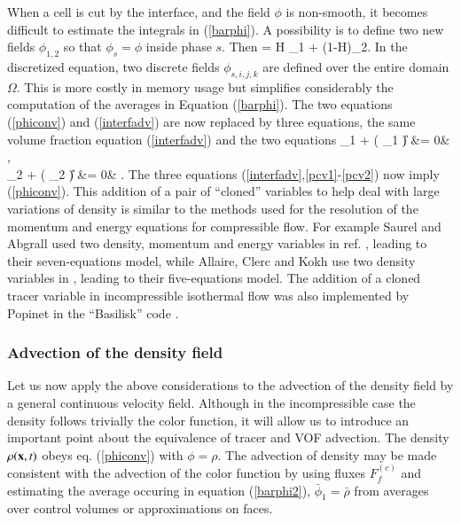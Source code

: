 When a cell is cut by the interface, and the field $\phi$ is non-smooth, it becomes difficult to estimate
the integrals in (\ref{barphi}). A possibility is to define two new fields $\phi_{1,2}$ so that 
$\phi_s = \phi$ inside phase $s$. Then
\be
\phi = H \phi_1 + (1-H)\phi_2.
\nd
In the discretized equation, two discrete fields $\phi_{s,i,j,k}$ are defined over the entire domain $\Omega$.
This is more costly in memory usage but simplifies considerably the computation of the averages in Equation
 (\ref{barphi}). The two equations (\ref{phiconv}) and (\ref{interfadv}) are now replaced by three equations,
the same volume fraction equation  (\ref{interfadv}) and the two equations
\bea
\dert \phi_1 + \nabla \cdot ( \phi_1 \U)  &= 0&  \label{pcv1}, \\ 
\dert \phi_2 + \nabla \cdot ( \phi_2 \U)  &= 0& \label{pcv2} . 
\nda
The three equations (\ref{interfadv},\ref{pcv1}-\ref{pcv2}) now imply (\ref{phiconv}). This addition of a pair of ``cloned'' variables to help deal with large variations of density is similar to the methods used for the resolution of the momentum and energy equations for compressible flow. For example Saurel and Abgrall used two density, momentum and energy variables in ref. \cite{Saurel99}, leading to their seven-equations model, while Allaire, Clerc and Kokh use two density variables in \cite{allaire02}, leading to their five-equations model. The addition of a cloned tracer variable in incompressible isothermal flow was also implemented by Popinet in the ``Basilisk'' code \cite{basilisk}. 

\subsubsection{Advection of the density field}

Let us now apply the above considerations to the advection of the density
field by a general continuous velocity field.
Although in the incompressible case the density follows trivially the color
function, it will allow us to introduce an important point
about the equivalence of tracer and VOF advection. 
The density $\rho({\bf x},t)$ obeys eq. (\ref{phiconv}) with 
$\phi = \rho$. %
The advection of density may be made consistent with the advection of the color function by 
using fluxes  $F_f^{(c)}$ and estimating
the average occuring in equation (\ref{barphi2}),  
$\bar \phi_1 = \bar \rho$ from averages over control volumes or approximations on faces.

